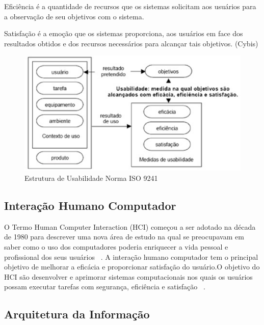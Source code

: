 	Eficiência é a quantidade de recursos que os sistemas solicitam aos usuários para a observação de seu objetivos com o sistema. ~\cite{cybis2010ergonomia}

	Satisfação é a emoção que os sistemas proporciona, aos usuários em face dos resultados obtidos e dos recursos necessários para alcançar tais objetivos. (Cybis)

\begin{figure}[h]
    \centering
    \includegraphics[keepaspectratio=true,scale=0.60]
      {figuras/estruturausabilidade9241.eps}
    \caption{Estrutura de Usabilidade Norma ISO 9241~\cite{cybis2010ergonomia}}
    \label{tdd_ciclo}
\end{figure}



\subsection{Interação Humano Computador}

	O Termo Human Computer Interaction  (HCI) começou a ser adotado na década de 1980 para descrever uma nova área de estudo na qual se preocupavam em saber como o uso dos computadores poderia enriquecer a vida pessoal e profissional dos seus usuários ~\cite{moraes2002}. 
	A interação humano computador tem o principal objetivo de melhorar a eficácia e proporcionar satisfação do usuário.O objetivo do HCI são desenvolver e aprimorar sistemas computacionais nos quais os usuários possam executar tarefas com segurança, eficiência e satisfação ~\cite{preece2007}.

	
\subsection{Arquitetura da Informação}


